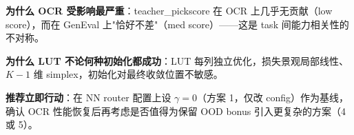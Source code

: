 \documentclass[11pt,a4paper]{article}
\begin{document}
\textbf{为什么 OCR 受影响最严重}：teacher\_pickscore 在 OCR 上几乎无贡献（low score），而在 GenEval 上"恰好不差"（med score）——这是 task 间能力相关性的不对称。

\textbf{为什么 LUT 不论何种初始化都成功}：LUT 每列独立优化，损失景观局部线性、$K{-}1$ 维 simplex，初始化对最终收敛位置不敏感。

\textbf{推荐立即行动}：在 NN router 配置上设 $\gamma = 0$（方案 1，仅改 config）作为基线，确认 OCR 性能恢复后再考虑是否值得为保留 OOD bonus 引入更复杂的方案（4 或 5）。
\end{document}
